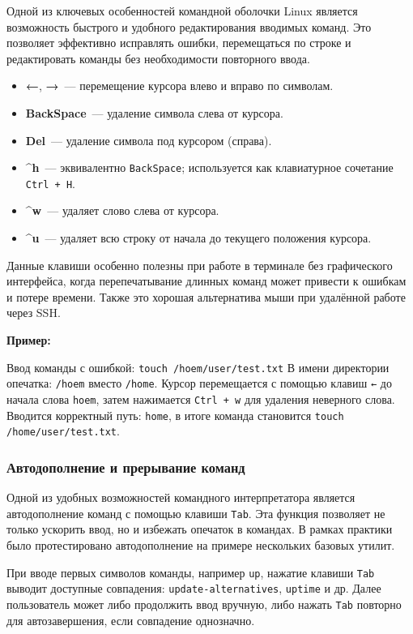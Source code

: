 Одной из ключевых особенностей командной оболочки Linux является возможность быстрого и удобного редактирования вводимых команд. Это позволяет эффективно исправлять ошибки, перемещаться по строке и редактировать команды без необходимости повторного ввода.

\begin{itemize}
    \item \textbf{←}, \textbf{→}~--- перемещение курсора влево и вправо по символам.
    \item \textbf{BackSpace}~--- удаление символа слева от курсора.
    \item \textbf{Del}~--- удаление символа под курсором (справа).
    \item \textbf{\^{ }h}~--- эквивалентно \texttt{BackSpace}; используется как клавиатурное сочетание \texttt{Ctrl + H}.
    \item \textbf{\^{ }w}~--- удаляет слово слева от курсора.
    \item \textbf{\^{ }u}~--- удаляет всю строку от начала до текущего положения курсора.
\end{itemize}

Данные клавиши особенно полезны при работе в терминале без графического интерфейса, когда перепечатывание длинных команд может привести к ошибкам и потере времени. Также это хорошая альтернатива мыши при удалённой работе через SSH.

\vspace{1em}
\noindent\textbf{Пример:}

Ввод команды с ошибкой: \texttt{touch /hoem/user/test.txt}
В имени директории опечатка: \texttt{/hoem} вместо \texttt{/home}.
Курсор перемещается с помощью клавиш \texttt{←} до начала слова \texttt{hoem}, затем нажимается \texttt{Ctrl + w} для удаления неверного слова. Вводится корректный путь: \texttt{home}, в итоге команда становится \texttt{touch /home/user/test.txt}.

\subsubsection*{Автодополнение и прерывание команд}

Одной из удобных возможностей командного интерпретатора является автодополнение команд с помощью клавиши \texttt{Tab}. Эта функция позволяет не только ускорить ввод, но и избежать опечаток в командах. В рамках практики было протестировано автодополнение на примере нескольких базовых утилит.

При вводе первых символов команды, например \texttt{up}, нажатие клавиши \texttt{Tab} выводит доступные совпадения: \texttt{update-alternatives}, \texttt{uptime} и др. Далее пользователь может либо продолжить ввод вручную, либо нажать \texttt{Tab} повторно для автозавершения, если совпадение однозначно.

